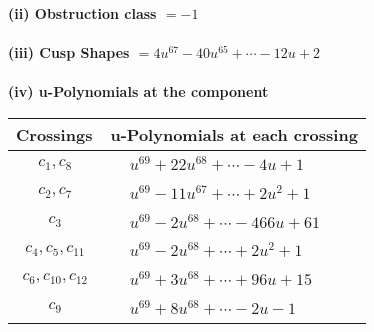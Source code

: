\documentclass[1p]{elsarticle_modified}
\theoremstyle{definition}
\begin{document}
\flushleft \textbf{(ii) Obstruction class $= -1$}\\~\\
\flushleft \textbf{(iii) Cusp Shapes $= 4 u^{67}-40 u^{65}+\cdots-12 u+2$}\\~\\
\newpage\renewcommand{\arraystretch}{1}
\flushleft \textbf{(iv) u-Polynomials at the component}\newline \\
\begin{tabular}{m{50pt}|m{274pt}}
Crossings & \hspace{64pt}u-Polynomials at each crossing \\
\hline $$\begin{aligned}c_{1},c_{8}\end{aligned}$$&$\begin{aligned}
&u^{69}+22 u^{68}+\cdots-4 u+1
\end{aligned}$\\
\hline $$\begin{aligned}c_{2},c_{7}\end{aligned}$$&$\begin{aligned}
&u^{69}-11 u^{67}+\cdots+2 u^2+1
\end{aligned}$\\
\hline $$\begin{aligned}c_{3}\end{aligned}$$&$\begin{aligned}
&u^{69}-2 u^{68}+\cdots-466 u+61
\end{aligned}$\\
\hline $$\begin{aligned}c_{4},c_{5},c_{11}\end{aligned}$$&$\begin{aligned}
&u^{69}-2 u^{68}+\cdots+2 u^2+1
\end{aligned}$\\
\hline $$\begin{aligned}c_{6},c_{10},c_{12}\end{aligned}$$&$\begin{aligned}
&u^{69}+3 u^{68}+\cdots+96 u+15
\end{aligned}$\\
\hline $$\begin{aligned}c_{9}\end{aligned}$$&$\begin{aligned}
&u^{69}+8 u^{68}+\cdots-2 u-1
\end{aligned}$\\
\hline
\end{tabular}\\~\\
\end{document}
